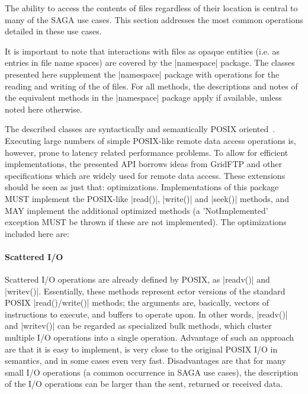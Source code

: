  
   The ability to access the contents of files regardless of
   their location is central to many of the SAGA use cases.
   This section addresses the most common operations detailed
   in these use cases.
   
   It is important to note that interactions with files
   as opaque entities (i.e. as entries in file name spaces) are
   covered by the |namespace| package.  The classes presented
   here supplement the |namespace| package with operations for the
   reading and writing of the  of files.  For all
   methods, the descriptions and notes of the equivalent methods
   in the |namespace| package apply if available, unless noted
   here otherwise.
   
   The described classes are syntactically and
   semantically POSIX
   oriented~\cite{posix1,posix2,posix3}.  Executing
   large numbers of simple POSIX-like remote data access
   operations is, however, prone to latency related
   performance problems.  To allow for efficient
   implementations, the presented API  borrows ideas from
   GridFTP and other specifications which are widely used for
   remote data access.  These extensions should be seen
   as just that: optimizations.  Implementations of this package
   MUST implement the POSIX-like |read()|, |write()| and
   |seek()| methods, and MAY implement the additional optimized
   methods (a 'NotImplemented' exception  MUST be thrown
   if these are not implemented).  The optimizations included
   here are:
 
   \paragraph{Scattered I/O}
   
   Scattered I/O operations are already defined by POSIX, as
   |readv()| and |writev()|.  Essentially, these methods
   represent ector versions of the standard POSIX
   |read()/write()| methods; the arguments are,
   basically,  vectors of instructions to
   execute, and buffers to operate upon.  In other
   words, |readv()| and |writev()| can be regarded as
   specialized bulk methods, which cluster multiple I/O
   operations into a single operation.  Advantage of such an
   approach are that it is easy to implement, is very close to
   the original POSIX I/O in semantics, and in some cases even
   very fast.  Disadvantages are that for many small I/O
   operations (a common occurrence in SAGA use cases), the
   description of the I/O operations can be larger than the
   sent, returned or received data.
 
